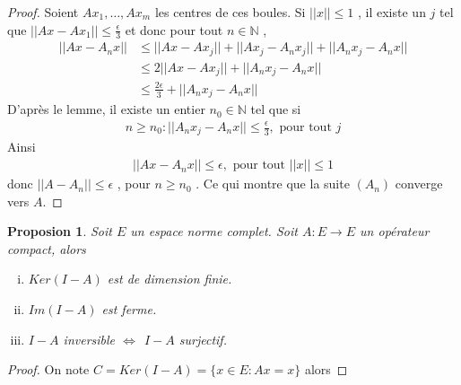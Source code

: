 \documentclass{report}
\newtheorem{Prop}{Proposion}[subsection]
\begin{document}
{\begin{proof}
Soient $Ax_1, \ldots, Ax_m$ les centres de ces boules. Si $||x|| \le 1$ , il existe un $j$ tel que $||Ax - Ax_1|| \le \frac{\epsilon}{3}$ et donc pour tout $n \in \mathbb{N}$ , 
					\begin{align*}
					 ||Ax - A_n x|| &\le ||Ax - Ax_j|| + ||Ax_j - A_nx_j|| + ||A_n x_j - A_n x|| \\
					 &\le 2||Ax - Ax_j|| + ||A_n x_j - A_n x|| \\
					 &\le \frac{2\epsilon}{3} + ||A_n x_j - A_n x|| 
					\end{align*}
D'après le lemme, il existe un entier $n_0 \in \mathbb{N}$ tel que si 
					\begin{align*}
					 n \ge n_0 : ||A_n x_j - A_n x|| \le \frac{\epsilon}{3} , \,\,\text{pour tout}\,\, j 
					\end{align*}
Ainsi 	
					\begin{align*}
					 ||A x - A_n x|| \le \epsilon , \,\,\text{pour tout}\,\, ||x|| \le 1 
					\end{align*}
donc $||A - A_n|| \le \epsilon$ , pour $n \ge n_0$ .  Ce qui montre que la suite $(A_n)$ converge vers $A$.
\end{proof}





\begin{Prop} Soit $E$ un espace norme complet. Soit $A: E \rightarrow E$ un opérateur compact, alors \\
	\begin{enumerate}[i)]
	\item    $Ker(I - A)$ est de dimension finie.
	\item   $Im(I - A)$ est ferme.
	\item  $I - A$ inversible $\Leftrightarrow ~~ I - A$ surjectif.
	\end{enumerate}
\end{Prop}
\begin{proof}
    On note $C = Ker(I-A) = \{x \in E : A x = x\}$ alors 
					

\end{proof}}
\end{document}

